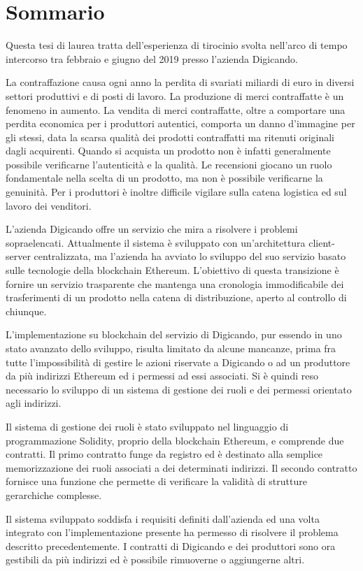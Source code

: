 \chapter*{Sommario} %
\label{sommario}


Questa tesi di laurea tratta dell'esperienza di tirocinio svolta nell'arco di tempo intercorso tra febbraio e giugno del 2019 presso l'azienda Digicando.

La contraffazione causa ogni anno la perdita di svariati miliardi di euro in diversi settori produttivi e di posti di lavoro. La produzione di merci contraffatte è un fenomeno in aumento. La vendita di merci contraffatte, oltre a comportare una perdita economica per i produttori autentici, comporta un danno d'immagine per gli stessi, data la scarsa qualità dei prodotti contraffatti ma ritenuti originali dagli acquirenti. Quando si acquista un prodotto non è infatti generalmente possibile verificarne l'autenticità e la qualità. Le recensioni giocano un ruolo fondamentale nella scelta di un prodotto, ma non è possibile verificarne la genuinità. Per i produttori è inoltre difficile vigilare sulla catena logistica ed sul lavoro dei venditori.

L'azienda Digicando offre un servizio che mira a risolvere i problemi sopraelencati. Attualmente il sistema è sviluppato con un'architettura client-server centralizzata, ma l'azienda ha avviato lo sviluppo del suo servizio basato sulle tecnologie della blockchain Ethereum. L'obiettivo di questa transizione è fornire un servizio trasparente che mantenga una cronologia immodificabile dei trasferimenti di un prodotto nella catena di distribuzione, aperto al controllo di chiunque.

L'implementazione su blockchain del servizio di Digicando, pur essendo in uno stato avanzato dello sviluppo, risulta limitato da alcune mancanze, prima fra tutte l'impossibilità di gestire le azioni riservate a Digicando o ad un produttore da più indirizzi Ethereum ed i permessi ad essi associati. Si è quindi reso necessario lo sviluppo di un sistema di gestione dei ruoli e dei permessi orientato agli indirizzi.

Il sistema di gestione dei ruoli è stato sviluppato nel linguaggio di programmazione Solidity, proprio della blockchain Ethereum, e comprende due contratti. Il primo contratto funge da registro ed è destinato alla semplice memorizzazione dei ruoli associati a dei determinati indirizzi. Il secondo contratto fornisce una funzione che permette di verificare la validità di strutture gerarchiche complesse.

Il sistema sviluppato soddisfa i requisiti definiti dall'azienda ed una volta integrato con l'implementazione presente ha permesso di risolvere il problema descritto precedentemente. I contratti di Digicando e dei produttori sono ora gestibili da più indirizzi ed è possibile rimuoverne o aggiungerne altri.
